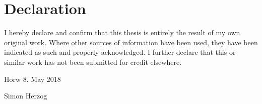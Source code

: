 \chapter*{Declaration}

I hereby declare and confirm that this thesis is entirely the result of my own original work. 
Where other sources of information have been used, they have been indicated as such and properly 
acknowledged. I further declare that this or similar work has not been submitted for credit elsewhere.

\vspace{15mm}

Horw \hspace{3mm} 8. May 2018

\vspace{15mm}

Simon Herzog
